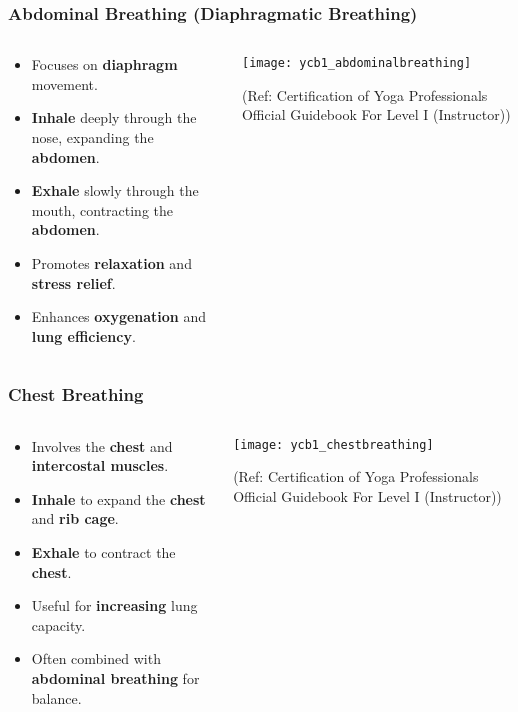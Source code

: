 \begin{frame}[fragile]\frametitle{Abdominal Breathing (Diaphragmatic Breathing)}
\begin{columns}
    \begin{column}[T]{0.5\linewidth}
      \begin{itemize}
        \item Focuses on \textbf{diaphragm} movement.
        \item \textbf{Inhale} deeply through the nose, expanding the \textbf{abdomen}.
        \item \textbf{Exhale} slowly through the mouth, contracting the \textbf{abdomen}.
        \item Promotes \textbf{relaxation} and \textbf{stress relief}.
        \item Enhances \textbf{oxygenation} and \textbf{lung efficiency}.
      \end{itemize}
    \end{column}
    \begin{column}[T]{0.5\linewidth}
        \begin{center}
        \texttt{[image: ycb1\_abdominalbreathing]}
				
		{\tiny (Ref: Certification  of Yoga Professionals Official Guidebook For Level I (Instructor))}	  		
        \end{center}	
    \end{column}
\end{columns}
\end{frame}

\begin{frame}[fragile]\frametitle{Chest Breathing}
\begin{columns}
    \begin{column}[T]{0.5\linewidth}
      \begin{itemize}
        \item Involves the \textbf{chest} and \textbf{intercostal muscles}.
        \item \textbf{Inhale} to expand the \textbf{chest} and \textbf{rib cage}.
        \item \textbf{Exhale} to contract the \textbf{chest}.
        \item Useful for \textbf{increasing} lung capacity.
        \item Often combined with \textbf{abdominal breathing} for balance.
      \end{itemize}
    \end{column}
    \begin{column}[T]{0.5\linewidth}
        \begin{center}
        \texttt{[image: ycb1\_chestbreathing]}
				
		{\tiny (Ref: Certification  of Yoga Professionals Official Guidebook For Level I (Instructor))}	  
        \end{center}	
    \end{column}
\end{columns}
\end{frame}

